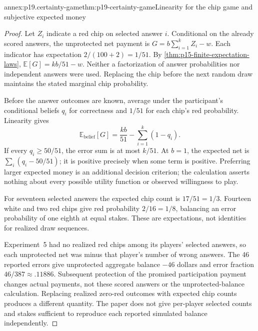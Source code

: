 \begin{annexitem}{annex:p19.certainty-game}{thm:p19-certainty-game}{Linearity for the chip game and subjective expected money}
\begin{proof}
Let \(Z_i\) indicate a red chip on selected answer \(i\). Conditional
on the already scored answers, the unprotected net payment is
\(G=b\sum_{i=1}^kZ_i-w\). Each indicator has expectation
\(2/(100+2)=1/51\). By \cref{thm:p15-finite-expectation-laws},
\(\mathbb E[G]=kb/51-w\). Neither a factorization of answer
probabilities nor independent answers were used. Replacing the chip before
the next random draw maintains the stated marginal chip probability.

Before the answer outcomes are known, average under the participant's
conditional beliefs \(q_i\) for correctness and \(1/51\) for each
chip's red probability. Linearity gives
\[
 \mathbb E_{\mathrm{belief}}[G]=\frac{kb}{51}-\sum_{i=1}^k(1-q_i).
\]
If every \(q_i\geq50/51\), the error sum is at most \(k/51\).
At \(b=1\), the expected net is \(\sum_i(q_i-50/51)\); it is
positive precisely when some term is positive. Preferring larger expected
money is an additional decision criterion; the calculation asserts nothing
about every possible utility function or observed willingness to play.

For seventeen selected answers the expected chip count is \(17/51=1/3\).
Fourteen white and two red chips give red probability \(2/16=1/8\),
balancing an error probability of one eighth at equal stakes. These are
expectations, not identities for realized draw sequences.

Experiment~5 had no realized red chips among its players' selected answers,
so each unprotected net was minus that player's number of wrong answers.
The 46 reported errors give unprotected aggregate balance \(-46\) dollars
and error fraction \(46/387\approx.11886\). Subsequent protection of
the promised participation payment changes actual payments, not these
scored answers or the unprotected-balance calculation. Replacing realized
zero-red outcomes with expected chip counts produces a different quantity.
The paper does not give per-player selected counts and stakes sufficient
to reproduce each reported simulated balance independently.
\end{proof}
\end{annexitem}
